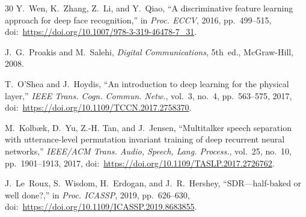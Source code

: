 \documentclass[review,12pt]{elsarticle}
\begin{document}
\begin{thebibliography}{30}
Y.~Wen, K.~Zhang, Z.~Li, and Y.~Qiao,
``A discriminative feature learning approach for deep face
recognition,''
in \emph{Proc. ECCV}, 2016, pp.~499--515,
doi:~\url{https://doi.org/10.1007/978-3-319-46478-7_31}.

J.~G.~Proakis and M.~Salehi,
\emph{Digital Communications}, 5th~ed., McGraw-Hill, 2008.

T.~O'Shea and J.~Hoydis,
``An introduction to deep learning for the physical layer,''
\emph{IEEE Trans. Cogn. Commun. Netw.}, vol.~3, no.~4, pp.~563--575,
2017, doi:~\url{https://doi.org/10.1109/TCCN.2017.2758370}.

M.~Kolb{\ae}k, D.~Yu, Z.-H. Tan, and J.~Jensen,
``Multitalker speech separation with utterance-level permutation
invariant training of deep recurrent neural networks,''
\emph{IEEE/ACM Trans. Audio, Speech, Lang. Process.}, vol.~25, no.~10,
pp.~1901--1913, 2017,
doi:~\url{https://doi.org/10.1109/TASLP.2017.2726762}.

J.~Le~Roux, S.~Wisdom, H.~Erdogan, and J.~R.~Hershey,
``SDR---half-baked or well done?,''
in \emph{Proc. ICASSP}, 2019, pp.~626--630,
doi:~\url{https://doi.org/10.1109/ICASSP.2019.8683855}.

\end{thebibliography}
\end{document}
